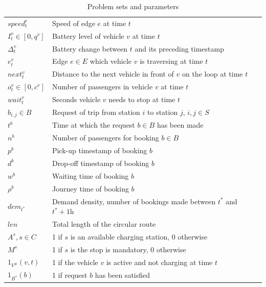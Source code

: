\documentclass[12pt,a4paper]{article}
\begin{document}
\begin{table}
{\begin{tabular}{| l | l |}
  $speed^{e}_{t}$ & Speed of edge $e$ at time $t$ \\
  $I^{v}_{t} \in [0, q^{v}]$ & Battery level of vehicle $v$ at time $t$ \\  
  $\Delta^{v}_{t}$ & Battery change between $t$ and its preceding timestamp \\  
  $e^{v}_{t}$ & Edge $e \in E$ which vehicle $v$ is traversing at time $t$ \\
  $next^{v}_{t}$ &  Distance to the next vehicle in front of $v$ on the loop at time $t$ \\
  $o^{v}_{t} \in [0, c^{v}]$ & Number of passengers in vehicle $v$ at time $t$ \\
  $wait^{v}_{t}$ & Seconds vehicle $v$ needs to stop at time $t$ \\  
  
  $b_{i,j} \in B$ & Request of trip from station $i$ to station $j$, $i,j \in S$ \\
  $t^{b}$ & Time at which the request $b \in B$ has been made \\
  $n^{b}$ & Number of passengers for booking $b \in B$ \\
  $p^{b}$ & Pick-up timestamp of booking $b$ \\
  $d^{b}$ & Drop-off timestamp of booking $b$ \\
  $w^{b}$ & Waiting time of booking $b$ \\
  $\rho^{b}$ & Journey time of booking $b$ \\
  $dem_{t^{*}}$ & Demand density, number of bookings made between $t^{*}$ and $t^{*} + 1\text{h}$\\
  $len$ & Total length of the circular route \\

  $A^{s}, s \in C$ & 1 if $s$ is an available charging station, 0 otherwise \\
  $M^{s}$ & 1 if $s$ is the stop is mandatory, 0 otherwise \\
  $1_{V^{\#}}(v,t)$ & 1 if the vehicle $v$ is active and not charging at time $t$ \\
  $1_{B^{*}}(b)$ & 1 if request $b$ has been satisfied \\
  \hline  
\end{tabular}
}
\caption{Problem sets and parameters}
\label{table:parameters}
\end{table}
\end{document}
